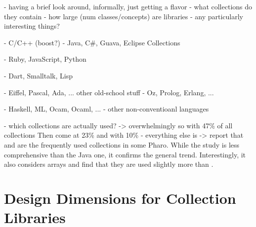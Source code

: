 \documentclass[sigconf, 10pt]{acmart}
\begin{document}
\begin{note}
- having a brief look around, informally, just getting a flavor
 - what collections do they contain
 - how large (num classes/concepts) are libraries
 - any particularly interesting things?

- C/C++ (boost?)
- Java, C\#, Guava, Eclipse Collections

- Ruby, JavaScript, Python

- Dart, Smalltalk, Lisp

- Eiffel, Pascal, Ada, ... other old-school stuff
- Oz, Prolog, Erlang, ... 

- Haskell, ML, Ocam, Ocaml, ...
- other non-conventioanl languages

- which collections are actually used?
 ->  overwhelmingly so with 47\% of all collections
    Then come  at 23\% and  with 10\% \citep{Costa:2017:ESU} 
    - everything else is 
 -> \citet[sec. 9.2]{Bergel:2018} report that  and  are the frequently used collections in some Pharo.
 While the study is less comprehensive than the Java one, it confirms the general trend. Interestingly, it also considers arrays and find that they are used slightly more than .

\end{note}

\section{Design Dimensions for Collection Libraries}
\end{document}

